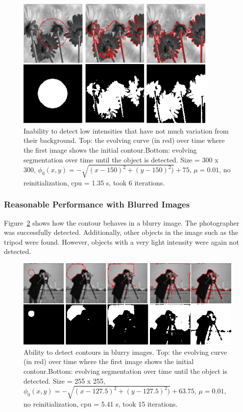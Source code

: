 \documentclass[10pt,twocolumn,letterpaper]{article}
\begin{document}
\begin{figure}[t]
\centering
\includegraphics[width=10cm]{cv_eg7.png}
\caption{Inability to detect low intensities that have not much variation from their background.  Top: the evolving curve (in red) over time where the first
image shows the initial
contour.Bottom: evolving segmentation over time until the object is detected. Size = 300 x 300, $\phi_{0}(x,y) = - \sqrt{(x - 150)^2 + (y - 150)^2)} + 75$,
$\mu =0.01$, no reinitialization, cpu = 1.35 s, took 6 iterations.}
\label{fig:cv_eg7}
\end{figure}

\subsubsection*{Reasonable Performance with Blurred Images}

Figure~\ref{fig:cv_eg9} shows how the contour behaves in a blurry image. The photographer was successfully detected. Additionally, other objects in the image
such as the tripod were found. However, objects with a very light intensity were again not detected.

\begin{figure}[t]
\centering
\includegraphics[width=12cm]{cv_eg9.png}
\caption{Ability to detect contours in blurry images.  Top: the evolving curve (in red) over time where the first
image shows the initial
contour.Bottom: evolving segmentation over time until the object is detected. Size = 255 x 255, $\phi_{0}(x,y) = - \sqrt{(x - 127.5)^2 + (y - 127.5)^2)} +
63.75$, $\mu =0.01$, no reinitialization, cpu = 5.41 s, took 15 iterations.}
\label{fig:cv_eg9}
\end{figure}
\end{document}
